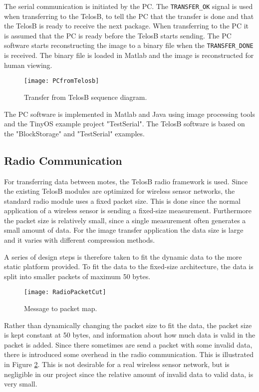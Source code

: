 The serial communication is initiated by the PC.
The \texttt{TRANSFER\_OK} signal is used when transferring to the TelosB, to tell the PC that the transfer is done and that the TelosB is ready to receive the next package.
When transferring to the PC it is assumed that the PC is ready before the TelosB starts sending.
The PC software starts reconstructing the image to a binary file when the \texttt{TRANSFER\_DONE} is received.
The binary file is loaded in Matlab and the image is reconstructed for human viewing.
\begin{figure}[H]
	\centering
	\texttt{[image: PCfromTelosb]}
	\caption{Transfer from TelosB sequence diagram.}
	\label{transferfromtelos}
\end{figure}
The PC software is implemented in Matlab and Java using image processing tools and the TinyOS example project "TestSerial".
The TelosB software is based on the "BlockStorage" and "TestSerial" examples.


\subsection{Radio Communication}\label{sec:Radio-Block}

For transferring data between motes, the TelosB radio framework is used. 
Since the existing TelosB modules are optimized for wireless sensor networks, the standard radio module uses a fixed packet size. 
This is done since the normal application of a wireless sensor is sending a fixed-size measurement. 
Furthermore the packet size is relatively small, since a single measurement often generates a small amount of data. 
For the image transfer application the data size is large and it varies with different compression methods.

A series of design steps is therefore taken to fit the dynamic data to the more static platform provided. 
To fit the data to the fixed-size architecture, the data is split into smaller packets of maximum 50 bytes. 

\begin{figure}[H]
	\centering
	\texttt{[image: RadioPacketCut]}
	\caption{Message to packet map.}
	\label{fig:RadioPacketCut}
\end{figure}

Rather than dynamically changing the packet size to fit the data, the packet size is kept constant at  50 bytes, and information about how much data is valid in the packet is added. 
Since there sometimes are send a packet with some invalid data, there is introduced some overhead in the radio communication. 
This is illustrated in Figure \ref{fig:RadioPacketCut}. 
This is not desirable for a real wireless sensor network, but is negligible in our project since the relative amount of invalid data to valid data, is very small.

